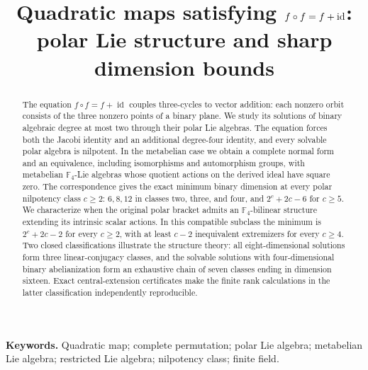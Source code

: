 \documentclass[11pt,a4paper]{article}
\title{Quadratic maps satisfying \(f\circ f=f+\id\):\\
polar Lie structure and sharp dimension bounds}
\author{}
\date{}
\theoremstyle{definition}
\theoremstyle{remark}
\newcommand{\F}{\mathbb F}
\newcommand{\id}{\operatorname{id}}
\begin{document}
\maketitle
\begin{abstract}
The equation \(f\circ f=f+\id\) couples three-cycles to vector addition:
each nonzero orbit consists of the three nonzero points of a binary plane.
We study its solutions of binary algebraic degree at most two through their
polar Lie algebras. The equation forces both the Jacobi identity and an
additional degree-four identity, and every solvable polar algebra is nilpotent.
In the metabelian case we obtain a complete normal form and an equivalence,
including isomorphisms and automorphism groups, with metabelian
\(\F_4\)-Lie algebras whose quotient actions on the derived ideal have square zero.
The correspondence gives the exact minimum binary dimension at every polar
nilpotency class \(c\ge2\): \(6,8,12\) in classes two, three, and four,
and \(2^c+2c-6\) for \(c\ge5\).
We characterize when the original polar bracket admits an \(\F_4\)-bilinear
structure extending its intrinsic scalar actions. In this compatible subclass
the minimum is \(2^c+2c-2\) for every \(c\ge2\), with at least \(c-2\)
inequivalent extremizers for every \(c\ge4\).
Two closed classifications illustrate the structure theory: all
eight-dimensional solutions form three linear-conjugacy classes, and the
solvable solutions with four-dimensional binary abelianization form an
exhaustive chain of seven classes ending in dimension sixteen. Exact central-extension
certificates make the finite rank calculations in the latter classification
independently reproducible.
\end{abstract}
\noindent\textbf{Keywords.}
Quadratic map; complete permutation; polar Lie algebra; metabelian Lie algebra;
restricted Lie algebra; nilpotency class; finite field.









\clearpage
\appendix

\clearpage

\end{document}
